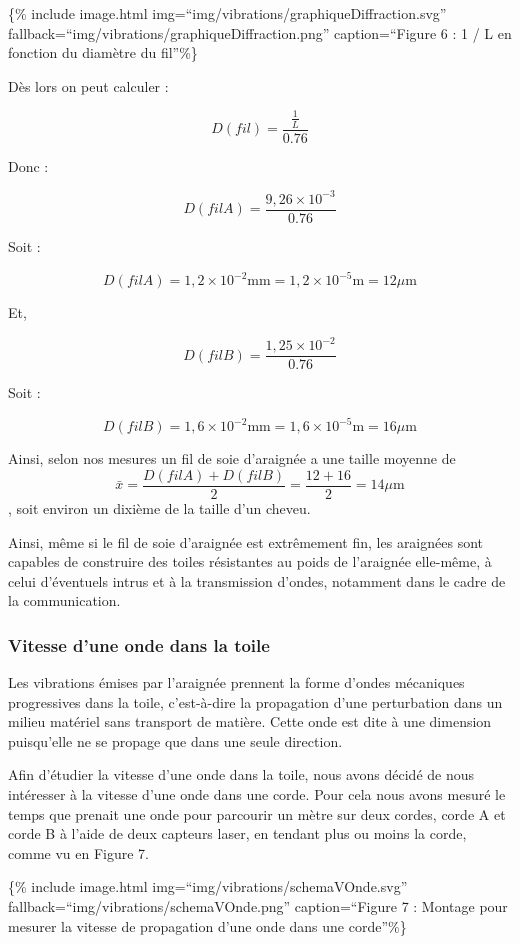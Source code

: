 \{\% include image.html img=``img/vibrations/graphiqueDiffraction.svg''
fallback=``img/vibrations/graphiqueDiffraction.png'' caption=``Figure 6
: 1 / L en fonction du diamètre du fil''\%\}

Dès lors on peut calculer :

\[ D(fil) = \frac{\frac{1}{L}}{0.76}\]

Donc :

\[D(filA) = \frac{9,26\times10^{-3}}{0.76}\]

Soit :

\[D(filA) = 1,2\times10^{-2} \text{mm} = 1,2\times10^{-5} \text{m} = 12 \mu\text{m}\]

Et,

\[D(filB) = \frac{1,25\times10^{-2}}{0.76}\]

Soit :

\[D(filB) = 1,6\times10^{-2} \text{mm} = 1,6\times10^{-5} \text{m} = 16 \mu\text{m}\]

Ainsi, selon nos mesures un fil de soie d'araignée a une taille moyenne
de
\[ \bar{x} = \frac{D(filA) + D(filB)}{2} = \frac{12 + 16}{2} = 14 \mu\text{m}\],
soit environ un dixième de la taille d'un cheveu.

Ainsi, même si le fil de soie d'araignée est extrêmement fin, les
araignées sont capables de construire des toiles résistantes au poids de
l'araignée elle-même, à celui d'éventuels intrus et à la transmission
d'ondes, notamment dans le cadre de la communication.

\subsubsection{Vitesse d'une onde dans la
toile}\label{vitesse-dune-onde-dans-la-toile}

Les vibrations émises par l'araignée prennent la forme d'ondes
mécaniques progressives dans la toile, c'est-à-dire la propagation d'une
perturbation dans un milieu matériel sans transport de matière. Cette
onde est dite à une dimension puisqu'elle ne se propage que dans une
seule direction.

Afin d'étudier la vitesse d'une onde dans la toile, nous avons décidé de
nous intéresser à la vitesse d'une onde dans une corde. Pour cela nous
avons mesuré le temps que prenait une onde pour parcourir un mètre sur
deux cordes, corde A et corde B à l'aide de deux capteurs laser, en
tendant plus ou moins la corde, comme vu en Figure 7.

\{\% include image.html img=``img/vibrations/schemaVOnde.svg''
fallback=``img/vibrations/schemaVOnde.png'' caption=``Figure 7 : Montage
pour mesurer la vitesse de propagation d'une onde dans une corde''\%\}

